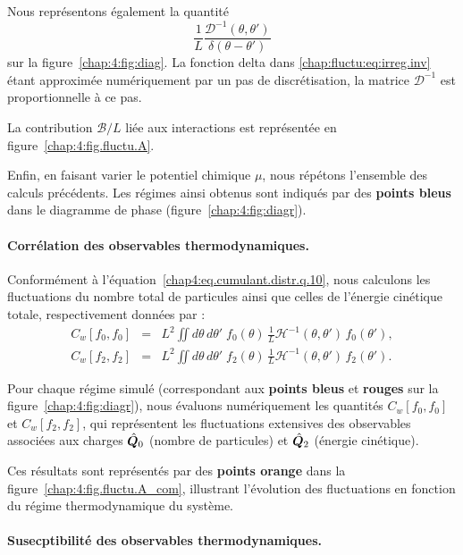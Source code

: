 \medskip

Nous représentons également la quantité
\[
\frac{1}{L} \frac{\mathcal{D}^{-1}(\theta, \theta')}{\delta(\theta - \theta')}
\]
sur la figure~\ref{chap:4:fig:diag}.  
La fonction delta dans \eqref{chap:fluctu:eq:irreg.inv} étant approximée numériquement par un pas de discrétisation, la matrice \( \mathcal{D}^{-1} \) est proportionnelle à ce pas.

\medskip

La contribution \( \mathcal{B}/L \) liée aux interactions est représentée en figure~\ref{chap:4:fig.fluctu.A}.

\medskip

Enfin, en faisant varier le potentiel chimique \( \mu \), nous répétons l'ensemble des calculs précédents.  
Les régimes ainsi obtenus sont indiqués par des {\bf points bleus} dans le diagramme de phase (figure~\ref{chap:4:fig:diagr}).


\paragraph{Corrélation des observables thermodynamiques.}

\medskip
Conformément à l’équation~\eqref{chap4:eq.cumulant.distr.q.10}, nous calculons les fluctuations du nombre total de particules ainsi que celles de l’énergie cinétique totale, respectivement données par :
\begin{eqnarray}
	C_w[f_0,f_0]  & = & L^2 \iint d\theta\, d\theta'\; f_0(\theta)\, \frac{1}{L}\mathcal{H}^{-1}(\theta , \theta')\, f_0(\theta') ,\\
	C_w[f_2,f_2]  & = & L^2 \iint d\theta\, d\theta'\; f_2(\theta)\, \frac{1}{L}\mathcal{H}^{-1}(\theta , \theta')\, f_2(\theta').
\end{eqnarray}

Pour chaque régime simulé (correspondant aux {\bf points bleus} et {\bf rouges} sur la figure~\ref{chap:4:fig:diagr}), nous évaluons numériquement les quantités \( C_w[f_0,f_0] \) et \( C_w[f_2,f_2] \), qui représentent les fluctuations extensives des observables associées aux charges \( \hat{\bm{Q}}_0 \) (nombre de particules) et \( \hat{\bm{Q}}_2 \) (énergie cinétique).

\medskip

Ces résultats sont représentés par des {\bf points orange} dans la figure~\ref{chap:4:fig.fluctu.A_com}, illustrant l’évolution des fluctuations en fonction du régime thermodynamique du système.


\paragraph{Susecptibilité des observables thermodynamiques.}

